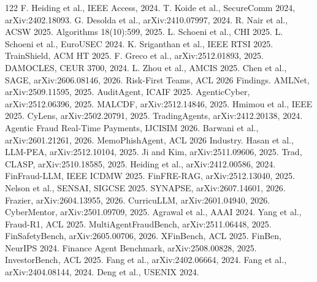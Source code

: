 \documentclass[11pt,a4paper]{article}
\begin{document}
\begin{thebibliography}{122}
 F. Heiding et al., IEEE Access, 2024.
 T. Koide et al., SecureComm 2024, arXiv:2402.18093.
 G. Desolda et al., arXiv:2410.07997, 2024.
 R. Nair et al., ACSW 2025.
 Algorithms 18(10):599, 2025.
 L. Schoeni et al., CHI 2025.
 L. Schoeni et al., EuroUSEC 2024.
 K. Sriganthan et al., IEEE RTSI 2025.
 TrainShield, ACM HT 2025.
 F. Greco et al., arXiv:2512.01893, 2025.
 DAMOCLES, CEUR 3700, 2024.
 L. Zhou et al., AMCIS 2025.
 Chen et al., SAGE, arXiv:2606.08146, 2026.
 Risk-First Teams, ACL 2026 Findings.
 AMLNet, arXiv:2509.11595, 2025.
 AuditAgent, ICAIF 2025.
 AgenticCyber, arXiv:2512.06396, 2025.
 MALCDF, arXiv:2512.14846, 2025.
 Hmimou et al., IEEE 2025.
 CyLens, arXiv:2502.20791, 2025.
 TradingAgents, arXiv:2412.20138, 2024.
 Agentic Fraud Real-Time Payments, IJCISIM 2026.
 Barwani et al., arXiv:2601.21261, 2026.
 MemoPhishAgent, ACL 2026 Industry.
 Hasan et al., LLM-PEA, arXiv:2512.10104, 2025.
 Ji and Kim, arXiv:2511.09606, 2025.
 Trad, CLASP, arXiv:2510.18585, 2025.
 Heiding et al., arXiv:2412.00586, 2024.
 FinFraud-LLM, IEEE ICDMW 2025.
 FinFRE-RAG, arXiv:2512.13040, 2025.
 Nelson et al., SENSAI, SIGCSE 2025.
 SYNAPSE, arXiv:2607.14601, 2026.
 Frazier, arXiv:2604.13955, 2026.
 CurricuLLM, arXiv:2601.04940, 2026.
 CyberMentor, arXiv:2501.09709, 2025.
 Agrawal et al., AAAI 2024.
 Yang et al., Fraud-R1, ACL 2025.
 MultiAgentFraudBench, arXiv:2511.06448, 2025.
 FinSafetyBench, arXiv:2605.00706, 2026.
 XFinBench, ACL 2025.
 FinBen, NeurIPS 2024.
 Finance Agent Benchmark, arXiv:2508.00828, 2025.
 InvestorBench, ACL 2025.
 Fang et al., arXiv:2402.06664, 2024.
 Fang et al., arXiv:2404.08144, 2024.
 Deng et al., USENIX 2024.

\end{thebibliography}
\end{document}
